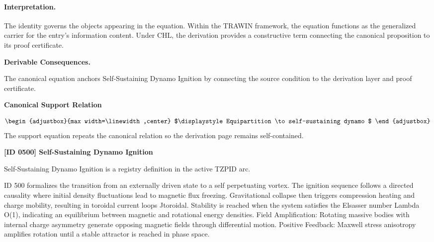 \paragraph{Interpretation.}
The identity governs the objects appearing in the equation. Within the TRAWIN framework, the equation functions as the generalized carrier for the entry’s information content. Under CHL, the derivation provides a constructive term connecting the canonical proposition to its proof certificate.

\par\vspace{0.35em}
\noindent\textbf{Derivable Consequences.}\quad
\begingroup
\footnotesize
\raggedright
The canonical equation anchors Self-Sustaining Dynamo Ignition by connecting the source condition to the derivation layer and proof certificate.
\par\endgroup

\noindent\textbf{Canonical Support Relation}\par
\[
\begin{adjustbox}{max width=\linewidth,center}
$\displaystyle
Equipartition \to self-sustaining dynamo
$
\end{adjustbox}
\]
\noindent The support equation repeats the canonical relation so the derivation page remains self-contained.\par

\clearpage
\noindent\textbf{[ID 0500] Self-Sustaining Dynamo Ignition}\par
\vspace{0.35em}
\begingroup\small
{}
Self-Sustaining Dynamo Ignition is a registry definition in the active TZPID arc.

ID 500 formalizes the transition from an externally driven state to a self perpetuating vortex. The ignition sequence follows a directed causality where initial density fluctuations lead to magnetic flux freezing. Gravitational collapse then triggers compression heating and charge mobility, resulting in toroidal current loops Jtoroidal. Stability is reached when the system satisfies the Elsasser number Lambda O(1), indicating an equilibrium between magnetic and rotational energy densities. Field Amplification: Rotating massive bodies with internal charge asymmetry generate opposing magnetic fields through differential motion. Positive Feedback: Maxwell stress anisotropy amplifies rotation until a stable attractor is reached in phase space.

